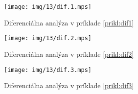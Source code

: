 \begin{priklad}
    \label{prikl:dif1}
    \begin{figure}[H]
        \centering
        \texttt{[image: img/13/dif.1.mps]}
        \caption{Diferenciálna analýza v príklade \ref{prikl:dif1}}
    \end{figure}
    
    
\end{priklad}

\begin{priklad}
    \label{prikl:dif2}
    \begin{figure}[H]
        \centering
        \texttt{[image: img/13/dif.2.mps]}
        \caption{Diferenciálna analýza v príklade \ref{prikl:dif2}}
    \end{figure}
    
    
\end{priklad}

\begin{priklad}
    \label{prikl:dif3}
    \begin{figure}[H]
        \centering
        \texttt{[image: img/13/dif.3.mps]}
        \caption{Diferenciálna analýza v príklade \ref{prikl:dif3}}
    \end{figure}
    
    
\end{priklad}
